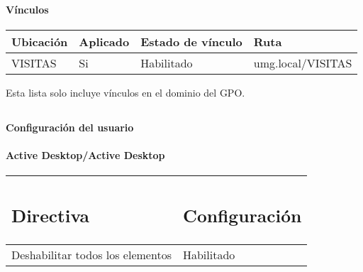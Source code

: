 \documentclass[
]{article}
\begin{document}
\hypertarget{vuxednculos-2}{%
\paragraph{Vínculos}\label{vuxednculos-2}}

\begin{longtable}[]{@{}llll@{}}
\toprule
\textbf{Ubicación} & \textbf{Aplicado} & \textbf{Estado de vínculo} &
\textbf{Ruta}\tabularnewline
\midrule
\endhead
VISITAS & Si & Habilitado & umg.local/VISITAS\tabularnewline
\bottomrule
\end{longtable}

Esta lista solo incluye vínculos en el dominio del GPO.

\hypertarget{section-14}{%
\subsection{}\label{section-14}}

\textbf{Configuración del usuario}

\hypertarget{active-desktopactive-desktop}{%
\paragraph{Active Desktop/Active
Desktop}\label{active-desktopactive-desktop}}

\begin{longtable}[]{@{}ll@{}}
\toprule
\begin{minipage}[b]{0.47\columnwidth}\raggedright
\hypertarget{directiva-1}{%
\subsection{Directiva}\label{directiva-1}}\strut
\end{minipage} & \begin{minipage}[b]{0.47\columnwidth}\raggedright
\hypertarget{configuraciuxf3n-1}{%
\subsection{Configuración}\label{configuraciuxf3n-1}}\strut
\end{minipage}\tabularnewline
\midrule
\endhead
Deshabilitar todos los elementos & Habilitado\tabularnewline
\bottomrule
\end{longtable}

\hypertarget{section-15}{%
\subsection{}\label{section-15}}
\end{document}
